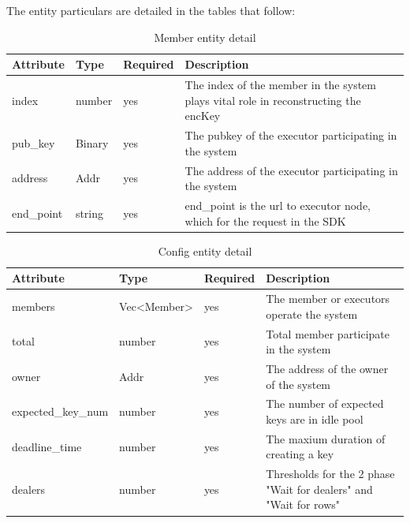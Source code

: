 \documentclass[../Main.tex]{subfiles}
\begin{document}
The entity particulars are detailed in the tables that follow:
\begin{table}[H]
  \centering
  \begin{tabular}{|l|l|l|p{9cm}|}
\hline
\rowcolor[HTML]{F56B00} 
\textbf{Attribute}               & \textbf{Type} & \textbf{Required} & \textbf{Description}                                                                \\ \hline
\cellcolor[HTML]{FFFFFF}index    & number        & yes               & The index of the member in the system plays vital role in reconstructing the encKey \\ \hline
\cellcolor[HTML]{FFFFFF}pub\_key & Binary        & yes               & The pubkey of the executor participating in the system                              \\ \hline
\cellcolor[HTML]{FFFFFF}address  & Addr          & yes               & The address of the executor participating in the system                             \\ \hline
end\_point                       & string        & yes               & end\_point is the url to executor node, which for the request in the SDK            \\ \hline
\end{tabular}
 \caption{Member entity detail}
    \label{fig:member-entity-detail}
\end{table}

\begin{table}[H]
    \centering
    \begin{tabular}{|l|l|l|p{7cm}|}
\hline
\rowcolor[HTML]{F56B00} 
\textbf{Attribute}              & \textbf{Type}                      & \textbf{Required} & \textbf{Description}                                              \\ \hline
\cellcolor[HTML]{FFFFFF}members & Vec\textless{}Member\textgreater{} & yes               & The member or executors operate the system                        \\ \hline
\cellcolor[HTML]{FFFFFF}total   & number                             & yes               & Total member participate in the system                            \\ \hline
\cellcolor[HTML]{FFFFFF}owner   & Addr                               & yes               & The address of the owner of the system                            \\ \hline
expected\_key\_num              & number                             & yes               & The number of expected keys are in idle pool                      \\ \hline
deadline\_time                  & number                             & yes               & The maxium duration of creating a key                             \\ \hline
dealers                         & number                             & yes               & Thresholds for the 2 phase "Wait for dealers" and "Wait for rows" \\ \hline
\end{tabular}
 \caption{Config entity detail}
    \label{fig:config-entity-detail}
\end{table}
\end{document}
